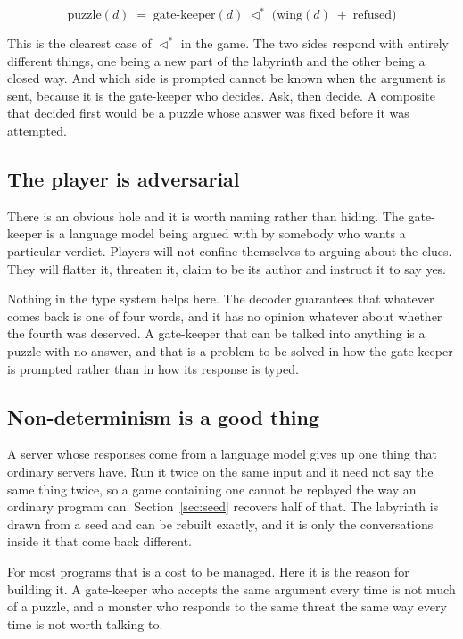 \documentclass[11pt,a4paper]{article}
\newcommand{\seqb}{\lhd^{\ast}}
\begin{document}
\[ \text{puzzle}(d) \;=\; \text{gate-keeper}(d) \;\seqb\; \bigl( \text{wing}(d) \;+\; \text{refused} \bigr) \]

This is the clearest case of $\seqb$ in the game. The two sides respond with entirely different
things, one being a new part of the labyrinth and the other being a closed way. And which side is
prompted cannot be known when the argument is sent, because it is the gate-keeper who decides. Ask,
then decide. A composite that decided first would be a puzzle whose answer was fixed before it
was attempted.

\subsection{The player is adversarial}
\label{sec:adversarial}

There is an obvious hole and it is worth naming rather than hiding. The gate-keeper is a language
model being argued with by somebody who wants a particular verdict. Players will not confine
themselves to arguing about the clues. They will flatter it, threaten it, claim to be its author
and instruct it to say yes.

Nothing in the type system helps here. The decoder guarantees that whatever comes back is one of
four words, and it has no opinion whatever about whether the fourth was deserved. A gate-keeper that
can be talked into anything is a puzzle with no answer, and that is a problem to be solved in how
the gate-keeper is prompted rather than in how its response is typed.

\subsection{Non-determinism is a good thing}
\label{sec:nondet}

A server whose responses come from a language model gives up one thing that ordinary servers have. Run it
twice on the same input and it need not say the same thing twice, so a game containing one cannot
be replayed the way an ordinary program can. Section~\ref{sec:seed} recovers half of that. The
labyrinth is drawn from a seed and can be rebuilt exactly, and it is only the conversations inside
it that come back different.

For most programs that is a cost to be managed. Here it is the reason for building it. A
gate-keeper who accepts the same argument every time is not much of a puzzle, and a monster who
responds to the same threat the same way every time is not worth talking to.
\end{document}
